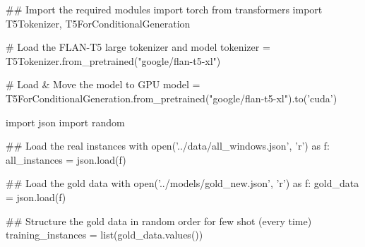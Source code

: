 
\begin{pyin}
\## Import the required modules
import torch
from transformers import T5Tokenizer, T5ForConditionalGeneration

# Load the FLAN-T5 large tokenizer and model
tokenizer = T5Tokenizer.from_pretrained("google/flan-t5-xl")

# Load & Move the model to GPU
model = T5ForConditionalGeneration.from_pretrained("google/flan-t5-xl").to('cuda')
\end{pyin}


\begin{pyin}
import json
import random
\end{pyin}

\begin{pyin}
\## Load the real instances
with open('../data/all_windows.json', 'r') as f:
    all_instances = json.load(f)
\end{pyin}

\begin{pyin}
\## Load the gold data
with open('../models/gold_new.json', 'r') as f:
    gold_data = json.load(f)
\end{pyin}

\begin{pyin}
\## Structure the gold data in random order for few shot (every time)
training_instances = list(gold_data.values())
\end{pyin}

